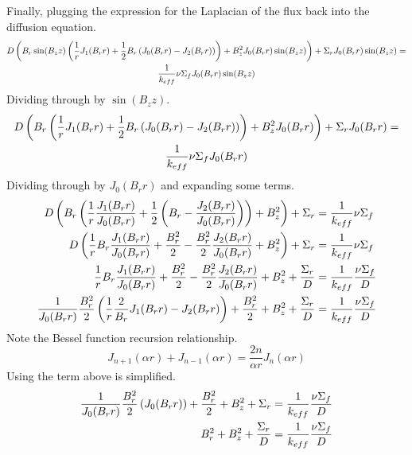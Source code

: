   Finally, plugging the expression for the Laplacian of the flux back into the
  diffusion equation.
  \begin{multline}
    D \left( B_r \sin(B_z z) \left( \frac{1}{r} J_1(B_r r) + \frac{1}{2} B_r
    \left( J_0(B_r r) - J_2(B_r r) \right) \right) + B_z^2 J_0(B_r r) \sin(B_z
    z) \right) + \Sigma_r J_0(B_r r) \sin(B_z z) = \\
    \frac{1}{k_{eff}} \nu \Sigma_f J_0(B_r r) \sin(B_z z)
  \end{multline}
  Dividing through by $\sin(B_z z)$.
  \begin{multline}
    D \left( B_r \left( \frac{1}{r} J_1(B_r r) + \frac{1}{2} B_r
    \left( J_0(B_r r) - J_2(B_r r) \right) \right) + B_z^2 J_0(B_r r) \right)+
    \Sigma_r J_0(B_r r) = 
    \\\frac{1}{k_{eff}} \nu \Sigma_f J_0(B_r r) 
  \end{multline}
  Dividing through by $J_0(B_r r)$ and expanding some terms.
  \begin{align}
    D \left( B_r \left( \frac{1}{r} \frac{J_1(B_r r)}{J_0(B_r r)} + 
      \frac{1}{2} \left(B_r - \frac{J_2(B_r r)}{J_0(B_r r)} \right) \right) 
      + B_z^2 \right)+ \Sigma_r &= \frac{1}{k_{eff}} \nu \Sigma_f \\
    D \left( \frac{1}{r} B_r \frac{J_1(B_r r)}{J_0(B_r r)} + \frac{B_r^2}{2} -
      \frac{B_r^2}{2} \frac{J_2(B_r r)}{J_0(B_r r)} + B_z^2 \right) + \Sigma_r&=
      \frac{1}{k_{eff}} \nu \Sigma_f  \\
    \frac{1}{r} B_r \frac{J_1(B_r r)}{J_0(B_r r)} + \frac{B_r^2}{2} -
      \frac{B_r^2}{2} \frac{J_2(B_r r)}{J_0(B_r r)} + B_z^2 + 
      \frac{\Sigma_r}{D} &= \frac{1}{k_{eff}} \frac{\nu \Sigma_f}{D}\\
    \frac{1}{J_0(B_r r)} \frac{B_r^2}{2} \left(\frac{1}{r} \frac{2}{B_r} 
      J_1(B_r r) - J_2(B_r r) \right) + \frac{B_r^2}{2} + B_z^2 + 
      \frac{\Sigma_r}{D} &= \frac{1}{k_{eff}} \frac{\nu \Sigma_f}{D}
  \end{align}
  Note the Bessel function recursion relationship.
  \begin{equation} \label{eq:bessel_recursion}
    J_{n+1}(\alpha r) + J_{n-1}(\alpha r) = \frac{2n}{\alpha r} J_n(\alpha r)
  \end{equation}
  Using  the term above is simplified.
  \begin{align}
    \frac{1}{J_0(B_r r)} \frac{B_r^2}{2} \left( J_0(B_r r) \right) + 
      \frac{B_r^2}{2} + B_z^2 + \Sigma_r &= \frac{1}{k_{eff}} 
      \frac{\nu \Sigma_f}{D} \\
    B_r^2 + B_z^2 + \frac{\Sigma_r}{D} &= \frac{1}{k_{eff}} \frac{\nu \Sigma_f}
      {D}
  \end{align}
